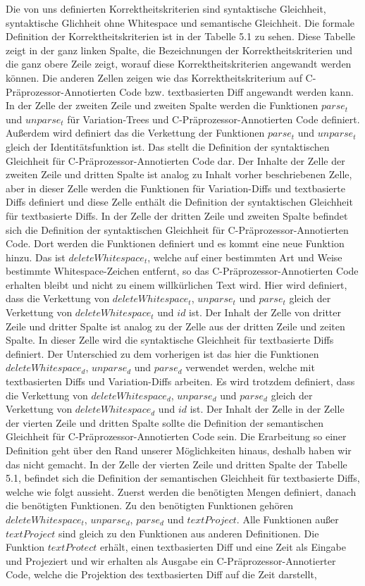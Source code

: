 Die von uns definierten Korrektheitskriterien sind syntaktische Gleichheit, syntaktische Glichheit ohne Whitespace und semantische Gleichheit. Die formale Definition der Korrektheitskriterien ist in der Tabelle 5.1 zu sehen. Diese Tabelle zeigt in der ganz linken Spalte, die Bezeichnungen der Korrektheitskriterien und die ganz obere Zeile zeigt, worauf diese Korrektheitskriterien angewandt werden können. Die anderen Zellen zeigen wie das Korrektheitskriterium auf C-Präprozessor-Annotierten Code bzw. textbasierten Diff angewandt werden kann. In der Zelle der zweiten Zeile und zweiten Spalte werden die Funktionen $parse_t$ und $unparse_t$ für Variation-Trees und C-Präprozessor-Annotierten Code definiert. Außerdem wird definiert das die Verkettung der Funktionen $parse_t$ und $unparse_t$ gleich der Identitätsfunktion ist. Das stellt die Definition der syntaktischen Gleichheit für C-Präprozessor-Annotierten Code dar. Der Inhalte der Zelle der zweiten Zeile und dritten Spalte ist analog zu Inhalt vorher beschriebenen Zelle, aber in dieser Zelle werden die Funktionen für Variation-Diffs und textbasierte Diffs definiert und diese Zelle enthält die Definition der syntaktischen Gleichheit für textbasierte Diffs. In der Zelle der dritten Zeile und zweiten Spalte befindet sich die Definition der syntaktischen Gleichheit für C-Präprozessor-Annotierten Code. Dort werden die Funktionen definiert und es kommt eine neue Funktion hinzu. Das ist $deleteWhitespace_t$, welche auf einer bestimmten Art und Weise bestimmte Whitespace-Zeichen entfernt, so das C-Präprozessor-Annotierten Code erhalten bleibt und nicht zu einem willkürlichen Text wird. Hier wird definiert, dass die Verkettung von $deleteWhitespace_t$, $unparse_t$ und $parse_t$ gleich der Verkettung von $deleteWhitespace_t$ und $id$ ist. Der Inhalt der Zelle von dritter Zeile und dritter Spalte ist analog zu der Zelle aus der dritten Zeile und zeiten Spalte. In dieser Zelle wird die syntaktische Gleichheit für textbasierte Diffs definiert. Der Unterschied zu dem vorherigen ist das hier die Funktionen $deleteWhitespace_d$, $unparse_d$ und $parse_d$ verwendet werden, welche mit textbasierten Diffs und Variation-Diffs arbeiten. Es wird trotzdem definiert, dass die Verkettung von $deleteWhitespace_d$, $unparse_d$ und $parse_d$ gleich der Verkettung von $deleteWhitespace_d$ und $id$ ist. Der Inhalt der Zelle in der Zelle der vierten Zeile und dritten Spalte sollte die Definition der semantischen Gleichheit für C-Präprozessor-Annotierten Code sein. Die  Erarbeitung so einer Definition geht über den Rand unserer Möglichkeiten hinaus, deshalb haben wir das nicht gemacht. In der Zelle der vierten Zeile und dritten Spalte der Tabelle 5.1, befindet sich die Definition der semantischen Gleichheit für textbasierte Diffs, welche wie folgt aussieht. Zuerst werden die benötigten Mengen definiert, danach die benötigten Funktionen. Zu den benötigten Funktionen gehören $deleteWhitespace_t$, $unparse_d$, $parse_d$ und $textProject$. Alle Funktionen außer $textProject$ sind gleich zu den Funktionen aus anderen Definitionen. Die Funktion $textProtect$ erhält, einen textbasierten Diff und eine Zeit als Eingabe und Projeziert und wir erhalten als Ausgabe ein C-Präprozessor-Annotierter Code, welche die Projektion des textbasierten Diff auf die Zeit darstellt, 